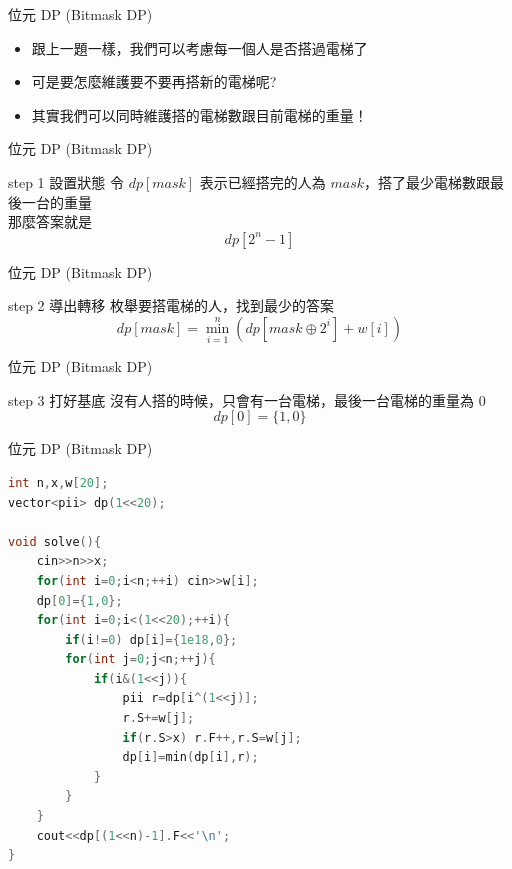 \documentclass[aspectratio=169]{beamer}
\begin{document}
    \begin{frame}{位元 DP (Bitmask DP)}
        \begin{itemize}
            \item 跟上一題一樣，我們可以考慮每一個人是否搭過電梯了
            \item 可是要怎麼維護要不要再搭新的電梯呢?
            \item<2-> 其實我們可以同時維護搭的電梯數跟目前電梯的重量！
        \end{itemize}
    \end{frame}
    
    \begin{frame}{位元 DP (Bitmask DP)}
        \begin{alertblock}{step 1 設置狀態}
            令 $dp[mask]$ 表示已經搭完的人為 $mask$，搭了最少電梯數跟最後一台的重量 \\
            \vspace{2.5mm}
            那麼答案就是 $$dp[2^n - 1]$$
        \end{alertblock}
    \end{frame}

    \begin{frame}{位元 DP (Bitmask DP)}
        \begin{block}{step 2 導出轉移}
            枚舉要搭電梯的人，找到最少的答案
            $$dp[mask] = \min_{i=1}^n(dp[mask \oplus 2^i] + w[i])$$
        \end{block}
    \end{frame}
    
    \begin{frame}{位元 DP (Bitmask DP)}
        \begin{block}{step 3 打好基底}
            沒有人搭的時候，只會有一台電梯，最後一台電梯的重量為 $0$
            $$dp[0] = \{1,0\}$$
        \end{block}
    \end{frame}

    \begin{frame}[fragile]{位元 DP (Bitmask DP)}
        \begin{lstlisting}[language=C++, basicstyle=\ttfamily\tiny]
int n,x,w[20];
vector<pii> dp(1<<20);
 
void solve(){
    cin>>n>>x;
    for(int i=0;i<n;++i) cin>>w[i];
    dp[0]={1,0};
    for(int i=0;i<(1<<20);++i){
        if(i!=0) dp[i]={1e18,0};
        for(int j=0;j<n;++j){
            if(i&(1<<j)){
                pii r=dp[i^(1<<j)];
                r.S+=w[j];
                if(r.S>x) r.F++,r.S=w[j];
                dp[i]=min(dp[i],r);
            }
        }
    }
    cout<<dp[(1<<n)-1].F<<'\n';
}
        \end{lstlisting}
    \end{frame}
    
\end{document}
